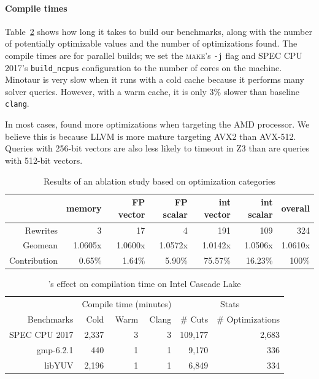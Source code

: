 \paragraph{Compile times}
%
Table~\ref{tab:compiletime} shows how long it takes \minotaur{} to build
our benchmarks, along with the number of potentially optimizable
values and the number of optimizations found.
%
The compile times are for parallel builds; we set the \textsc{make}'s
\texttt{-j} flag and SPEC CPU 2017's \texttt{build\_ncpus}
configuration to the number of cores on the machine.
%
Minotaur is very slow when it runs with a cold cache because it
performs many solver queries.
%
However, with a warm cache, it is only 3\% slower than baseline \texttt{clang}.


In most cases, \minotaur{} found more optimizations when targeting the AMD
processor.
%
We believe this is because LLVM is more mature targeting
AVX2 than AVX-512.
%
Queries with 256-bit vectors are also less likely to timeout in Z3 than
are queries with 512-bit vectors.

\begin{table}[t]
  \centering
  \caption{Results of an ablation study based on optimization categories}
  \begin{tabular}{ r | r r r r r r}
    & memory & FP vector & FP scalar& int vector & int scalar & overall \\
    \hline
    Rewrites & 3 & 17 & 4 & 191 & 109 & 324 \\
    Geomean & 1.0605x & 1.0600x & 1.0572x & 1.0142x & 1.0506x & 1.0610x \\
    Contribution & 0.65\% & 1.64\% & 5.90\% & 75.57\% & 16.23\% & 100\% \\
  \end{tabular}
  \label{tab:ablation}
\end{table}


\begin{table}[t]
  \centering
  \caption{\minotaur's effect on compilation time on Intel Cascade Lake}
  \begin{tabular}{r | r r r | r r }
    & \multicolumn{3}{c|}{Compile time (minutes)} & \multicolumn{2}{c}{Stats} \\
    Benchmarks & Cold & Warm & Clang & \# Cuts & \# Optimizations \\
    \hline
    SPEC CPU 2017 & 2,337 & 3 & 3 & 109,177 & 2,683  \\
    gmp-6.2.1 & 440 &  1 &  1 & 9,170 & 336 \\
    libYUV & 2,196 &  1 &  1 & 6,849 & 334  \\
  \end{tabular}
  \label{tab:compiletime}
\end{table}


